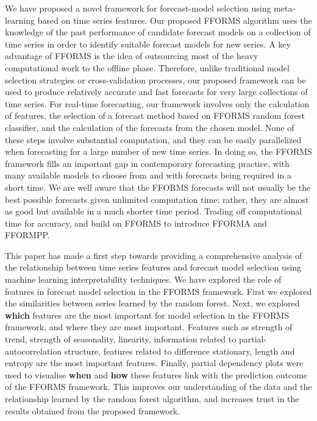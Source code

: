 \documentclass[11pt,a4paper,]{article}
\begin{document}
We have proposed a novel framework for forecast-model selection using meta-learning based on time series features. Our proposed FFORMS algorithm uses the knowledge of the past performance of candidate forecast models on a collection of time series in order to identify suitable forecast models for new series. A key advantage of FFORMS is the idea of outsourcing most of the heavy computational work to the offline phase. Therefore, unlike traditional model selection strategies or cross-validation processes, our proposed framework can be used to produce relatively accurate and fast forecasts for very large collections of time series. For real-time forecasting, our framework involves only the calculation of features, the selection of a forecast method based on FFORMS random forest classifier, and the calculation of the forecasts from the chosen model. None of these steps involve substantial computation, and they can be easily parallelized when forecasting for a large number of new time series. In doing so, the FFORMS framework fills an important gap in contemporary forecasting practice, with many available models to choose from and with forecasts being required in a short time. We are well aware that the FFORMS forecasts will not usually be the best possible forecasts given unlimited computation time; rather, they are almost as good but available in a much shorter time period. Trading off computational time for accuracy, \textcite{MonManEtAl2020} and \textcite{TalEtAl2022} build on FFORMS to introduce FFORMA and FFORMPP.

This paper has made a first step towards providing a comprehensive analysis of the relationship between time series features and forecast model selection using machine learning interpretability techniques. We have explored the role of features in forecast model selection in the FFORMS framework. First we explored the similarities between series learned by the random forest. Next, we explored \textbf{which} features are the most important for model selection in the FFORMS framework, and where they are most important. Features such as strength of trend, strength of seasonality, linearity, information related to partial-autocorrelation structure, features related to difference stationary, length and entropy are the most important features. Finally, partial dependency plots were used to visualise \textbf{when} and \textbf{how} these features link with the prediction outcome of the FFORMS framework. This improves our understanding of the data and the relationship learned by the random forest algorithm, and increases trust in the results obtained from the proposed framework.
\end{document}
